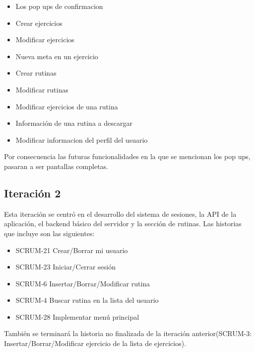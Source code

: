 \begin{itemize}
	\item Los pop ups de confirmacion
	\item Crear ejercicios
	\item Modificar ejercicios
	\item Nueva meta en un ejercicio
	\item Crear rutinas
	\item Modificar rutinas
	\item Modificar ejercicios de una rutina
	\item Información de una rutina a descargar
	\item Modificar informacion del perfil del usuario
\end{itemize}

Por consecuencia las futuras funcionalidades en la que se mencionan los pop ups, pasaran a ser pantallas completas.

\subsection{Iteración 2}
Esta iteración se centró en el desarrollo del sistema de sesiones, la API de la aplicación, el backend básico del servidor y la sección de rutinas. Las historias que incluye son las siguientes:

\begin{itemize}
  \item SCRUM-21 Crear/Borrar mi usuario
  \item SCRUM-23 Iniciar/Cerrar sesión
  \item SCRUM-6 Insertar/Borrar/Modificar rutina
  \item SCRUM-4 Buscar rutina en la lista del usuario
  \item SCRUM-28 Implementar menú principal
\end{itemize}

También se terminará la historia no finalizada de la iteración anterior(SCRUM-3: Insertar/Borrar/Modificar ejercicio de la lista de ejercicios).


